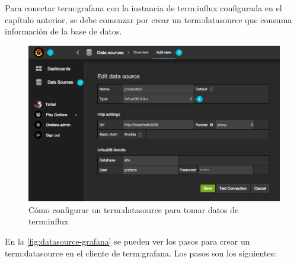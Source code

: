 Para conectar \gls{term:grafana} con la instancia de \gls{term:influx}
configurada en el capítulo anterior, se debe comenzar por crear un \gls{term:datasource}
que consuma información de la base de datos.

\begin{figure}
  \includegraphics[width=\linewidth]{src/images/05-capitulo-5/datasource-grafana.jpg}
  \caption{Cómo configurar un \gls{term:datasource} para tomar datos de \gls{term:influx}}
  \label{fig:datasource-grafana}
\end{figure}

En la \autoref{fig:datasource-grafana} se pueden ver los pasos para crear un
\gls{term:datasource} en el cliente  de \gls{term:grafana}. Los pasos son los
siguientes:

